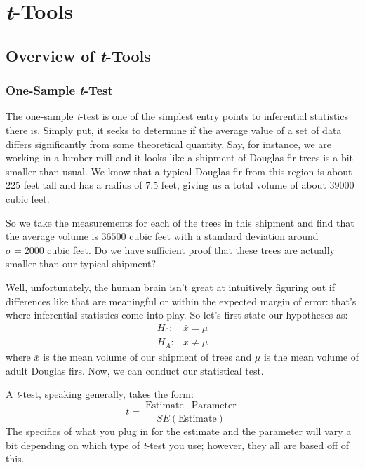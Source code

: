 
\chapter{\textit{t}-Tools}

\section{Overview of \textit{t}-Tools}

\subsection{One-Sample \textit{t}-Test}

The one-sample \textit{t}-test is one of the simplest entry points to inferential statistics there is. Simply put, it seeks to determine if the average value of a set of data differs significantly from some theoretical quantity. Say, for instance, we are working in a lumber mill and it looks like a shipment of Douglas fir trees is a bit smaller than usual. We know that a typical Douglas fir from this region is about 225 feet tall and has a radius of 7.5 feet, giving us a total volume of about $39000$ cubic feet.

So we take the measurements for each of the trees in this shipment and find that the average volume is $36500$ cubic feet with a standard deviation around $\sigma = 2000$ cubic feet. Do we have sufficient proof that these trees are actually smaller than our typical shipment?

Well, unfortunately, the human brain isn't great at intuitively figuring out if differences like that are meaningful or within the expected margin of error: that's where inferential statistics come into play. So let's first state our hypotheses as:
\begin{eqnarray*}
H_0:& \bar{x} = \mu\\
H_A:& \bar{x} \neq \mu
\end{eqnarray*}
where $\bar{x}$ is the mean volume of our shipment of trees and $\mu$ is the mean volume of adult Douglas firs. Now, we can conduct our statistical test.

A \textit{t}-test, speaking generally, takes the form:
\begin{equation}
t = \frac{\text{Estimate}-\text{Parameter}}{SE(\text{Estimate})}
\end{equation}
The specifics of what you plug in for the estimate and the parameter will vary a bit depending on which type of \textit{t}-test you use; however, they all are based off of this.

